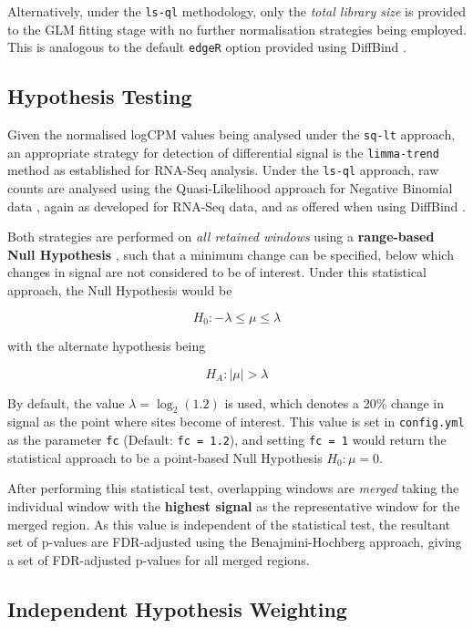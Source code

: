 \documentclass[
]{book}
\begin{document}
Alternatively, under the \texttt{ls-ql} methodology, only the \emph{total library size} is provided to the GLM fitting stage with no further normalisation strategies being employed.
This is analogous to the default \texttt{edgeR} option provided using DiffBind \citep{diffbind}.

\hypertarget{hypothesis-testing}{%
\subsection*{Hypothesis Testing}\label{hypothesis-testing}}

Given the normalised logCPM values being analysed under the \texttt{sq-lt} approach, an appropriate strategy for detection of differential signal is the \texttt{limma-trend} method \citep{voom} as established for RNA-Seq analysis.
Under the \texttt{ls-ql} approach, raw counts are analysed using the Quasi-Likelihood approach for Negative Binomial data \citep{qlf}, again as developed for RNA-Seq data, and as offered when using DiffBind \citep{diffbind}.

Both strategies are performed on \emph{all retained windows} using a \textbf{range-based Null Hypothesis} \citep{treat}, such that a minimum change can be specified, below which changes in signal are not considered to be of interest.
Under this statistical approach, the Null Hypothesis would be

\[
H_0: -\lambda \leq \mu \leq \lambda
\]

with the alternate hypothesis being

\[
H_A: |\mu| > \lambda
\]

By default, the value \(\lambda = \log_2(1.2)\) is used, which denotes a 20\% change in signal as the point where sites become of interest.
This value is set in \texttt{config.yml} as the parameter \texttt{fc} (Default: \texttt{fc\ =\ 1.2}), and setting \texttt{fc\ =\ 1} would return the statistical approach to be a point-based Null Hypothesis \(H_0: \mu = 0\).

After performing this statistical test, overlapping windows are \emph{merged} taking the individual window with the \textbf{highest signal} as the representative window for the merged region.
As this value is independent of the statistical test\citep{csaw}, the resultant set of p-values are FDR-adjusted using the Benajmini-Hochberg approach\citep{fdr}, giving a set of FDR-adjusted p-values for all merged regions.

\hypertarget{independent-hypothesis-weighting}{%
\subsection*{Independent Hypothesis Weighting}\label{independent-hypothesis-weighting}}
\end{document}
